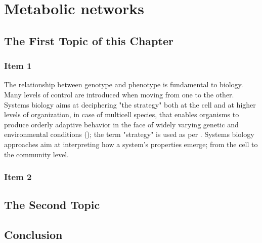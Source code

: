 \chapter{Metabolic networks}
\label{cha:n}


\section{The First Topic of this Chapter}
\subsection{Item 1}
The relationship between genotype and phenotype is fundamental to biology.
Many levels of control are introduced when moving from one to the other. 
Systems biology aims at deciphering "the strategy" both at the cell and at higher levels of organization, in case of multicell species, that enables organisms to produce orderly adaptive behavior in the face of widely varying genetic and environmental conditions (\cite{strohman2002maneuvering}); the term "strategy" is used as per \cite{polanyi1968life}.
Systems biology approaches aim at interpreting how a system's properties emerge; from the cell to the community level.


\subsection{Item 2}


\section{The Second Topic}


\section{Conclusion}


